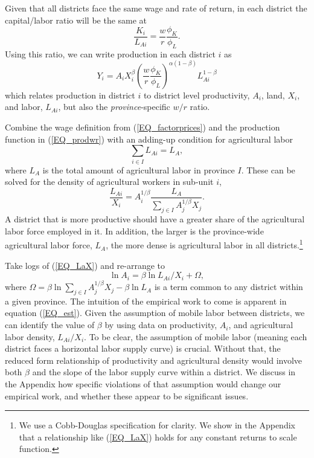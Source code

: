 \documentclass[11pt]{article}
\begin{document}
Given that all districts face the same wage and rate of return, in each district the capital/labor ratio will be the same at
\begin{equation}
    \frac{K_i}{L_{Ai}} = \frac{w}{r}\frac{\phi_K}{\phi_L}. \nonumber
\end{equation}
Using this ratio, we can write production in each district $i$ as
\begin{equation}
Y_{i} = A_{i} X_{i}^{\beta} \left(\frac{w}{r}\frac{\phi_K}{\phi_L}\right)^{\alpha(1-\beta)} L_{Ai}^{1-\beta} \label{EQ_prodwr}
\end{equation}
which relates production in district $i$ to district level productivity, $A_i$, land, $X_i$, and labor, $L_{Ai}$, but also the \textit{province}-specific $w/r$ ratio.

Combine the wage definition from (\ref{EQ_factorprices}) and the production function in (\ref{EQ_prodwr}) with an adding-up condition for agricultural labor 
\begin{equation}
\sum_{i\in I} L_{Ai} = L_A, \nonumber
\end{equation}
where $L_A$ is the total amount of agricultural labor in province $I$. These can be solved for the density of agricultural workers in sub-unit $i$,
\begin{equation}
\frac{L_{Ai}}{X_i} = A_{i}^{1/\beta}\frac{L_A}{\sum_{j\in I} A_{j}^{1/\beta}X_{j}}. \label{EQ_LaX}
\end{equation}
A district that is more productive should have a greater share of the agricultural labor force employed in it. In addition, the larger is the province-wide agricultural labor force, $L_A$, the more dense is agricultural labor in all districts.\footnote{We use a Cobb-Douglas specification for clarity. We show in the Appendix that a relationship like (\ref{EQ_LaX}) holds for any constant returns to scale function.} 

Take logs of (\ref{EQ_LaX}) and re-arrange to
\begin{equation}
\ln A_{i} = \beta \ln L_{Ai}/X_i + \Omega, \label{EQ_est}
\end{equation}
where $\Omega = \beta \ln \sum_{j\in I} A_{j}^{1/\beta}X_{j} - \beta \ln L_A$ is a term common to any district within a given province. The intuition of the empirical work to come is apparent in equation (\ref{EQ_est}). Given the assumption of mobile labor between districts, we can identify the value of $\beta$ by using data on productivity, $A_i$, and agricultural labor density, $L_{Ai}/X_i$. To be clear, the assumption of mobile labor (meaning each district faces a horizontal labor supply curve) is crucial. Without that, the reduced form relationship of productivity and agricultural density would involve both $\beta$ and the slope of the labor supply curve within a district. We discuss in the Appendix how specific violations of that assumption would change our empirical work, and whether these appear to be significant issues.
\end{document}

